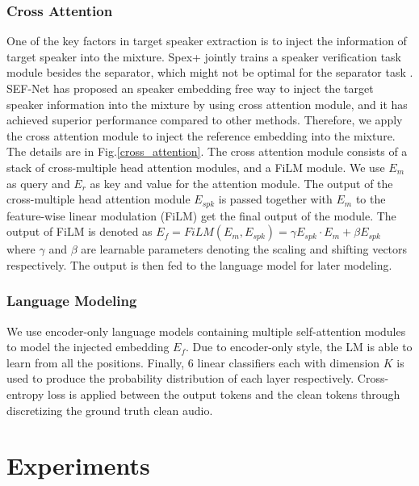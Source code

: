 \documentclass[conference]{IEEEtran}
\begin{document}
\subsubsection{Cross Attention}
One of the key factors in target speaker extraction is to 
inject the information of target speaker 
into the mixture. Spex+ \cite{spex_plus} jointly trains a speaker verification task module 
besides the separator, which might not be optimal for the separator task \cite{sef_net}. SEF-Net \cite{sef_net} has proposed an speaker embedding free way to inject the 
target speaker information into the mixture by using cross attention module, and it has 
achieved superior performance compared to other methods. Therefore, we apply 
the cross attention module to inject the reference embedding into the mixture. The details 
are in Fig.\ref{cross_attention}.
The cross attention module consists of a stack of cross-multiple head attention modules, 
and a FiLM module. 
We use \(E_m\) as query and \(E_r\) as key and value for 
the attention module. The output of the cross-multiple head attention module \(E_{spk}\)
is passed together with \(E_m\) to the feature-wise linear modulation (FiLM) get the final output of the module. The output of 
FiLM is denoted as \(E_f = FiLM(E_m, E_{spk}) = \gamma E_{spk} \cdot E_m  + \beta E_{spk} \) where 
\(\gamma\) and \(\beta\) are learnable parameters denoting the scaling and shifting vectors 
respectively. The output is then fed to the language model for later modeling.  
\subsubsection{Language Modeling}
We use encoder-only language models containing multiple self-attention modules to model the injected 
embedding \(E_f\). Due to encoder-only style, the LM is able to learn from all the positions. 
Finally, 6 linear classifiers each with dimension \(K\) is used to produce the probability 
distribution of each layer respectively.
Cross-entropy loss is applied between 
the output tokens and the clean tokens through discretizing the 
ground truth clean audio. 

\section{Experiments}
\end{document}
